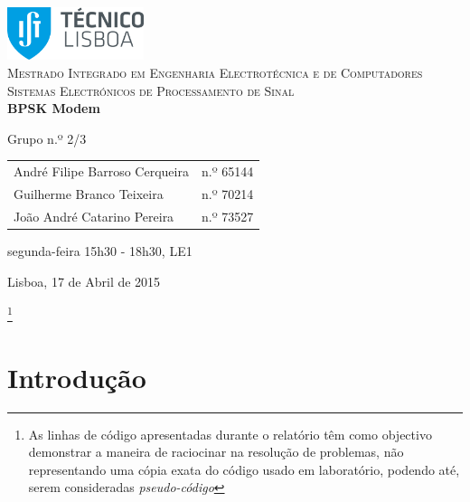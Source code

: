 \documentclass[11pt]{article}
\begin{document}
\begin{titlepage}
	\begin{center}
		
		\hfill \break
		\hfill \break
		
		\includegraphics[width=0.3\textwidth]{./logo}~\\[1cm]
		
		\textsc{\Large Mestrado Integrado em Engenharia Electrotécnica e de Computadores}\\[1.5cm]
		\textsc{\huge Sistemas Electrónicos de Processamento de Sinal}\\[0.25cm]
		
		{\huge \bfseries BPSK Modem \\[1.2cm]}
		
		Grupo n.º 2/3 \vspace{0.3cm}
		
		\begin{tabular}{l r}
			André Filipe Barroso Cerqueira \hspace{1mm} & n.º 65144 \\
			Guilherme Branco Teixeira \hspace{1mm} & n.º 70214  \\
			João André Catarino Pereira & n.º 73527
		\end{tabular}
		
		\hfill
		\hfill
		
		segunda-feira 15h30 - 18h30, LE1
		
	
		\vfill
		
		{\large Lisboa, 17 de Abril de 2015} 
		
	\end{center}
\end{titlepage}
\clearpage

	\footnote{As linhas de código apresentadas durante o relatório têm como objectivo demonstrar a maneira de raciocinar na resolução de problemas, não representando uma cópia exata do código usado em laboratório, podendo até, serem consideradas \textit{pseudo-código}}
	
\tableofcontents
\pagebreak

\clearpage
{}

\section{Introdução}
\end{document}
